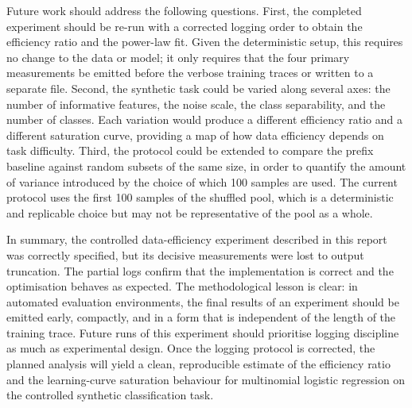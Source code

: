 \documentclass{article}
\begin{document}
Future work should address the following questions. First, the completed experiment should be re-run with a corrected logging order to obtain the efficiency ratio and the power-law fit. Given the deterministic setup, this requires no change to the data or model; it only requires that the four primary measurements be emitted before the verbose training traces or written to a separate file. Second, the synthetic task could be varied along several axes: the number of informative features, the noise scale, the class separability, and the number of classes. Each variation would produce a different efficiency ratio and a different saturation curve, providing a map of how data efficiency depends on task difficulty. Third, the protocol could be extended to compare the prefix baseline against random subsets of the same size, in order to quantify the amount of variance introduced by the choice of which 100 samples are used. The current protocol uses the first 100 samples of the shuffled pool, which is a deterministic and replicable choice but may not be representative of the pool as a whole.

In summary, the controlled data-efficiency experiment described in this report was correctly specified, but its decisive measurements were lost to output truncation. The partial logs confirm that the implementation is correct and the optimisation behaves as expected. The methodological lesson is clear: in automated evaluation environments, the final results of an experiment should be emitted early, compactly, and in a form that is independent of the length of the training trace. Future runs of this experiment should prioritise logging discipline as much as experimental design. Once the logging protocol is corrected, the planned analysis will yield a clean, reproducible estimate of the efficiency ratio and the learning-curve saturation behaviour for multinomial logistic regression on the controlled synthetic classification task.
\end{document}
